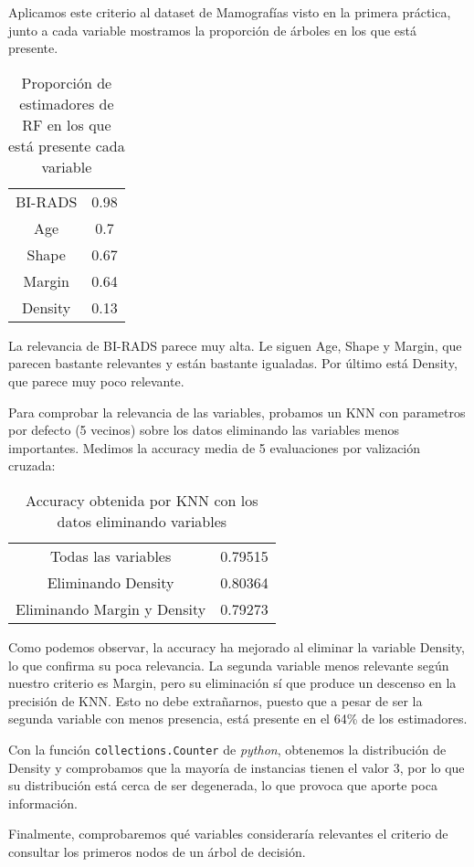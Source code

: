 \documentclass{article}
\begin{document}
  Aplicamos este criterio al dataset de Mamografías visto en la
  primera práctica, junto a cada variable mostramos la proporción de
  árboles en los que está presente.

  \begin{table}[H]
    \centering
    \begin{tabular}{c|c}
      BI-RADS     & 0.98 \\
      Age         & 0.7 \\
      Shape       & 0.67 \\
      Margin      & 0.64 \\
      Density     & 0.13
    \end{tabular}
    \caption{Proporción de estimadores de RF en los que está presente cada variable}
  \end{table}

  La relevancia de BI-RADS parece muy alta. Le siguen Age, Shape y
  Margin, que parecen bastante relevantes y están bastante
  igualadas. Por último está Density, que parece muy poco relevante.

  Para comprobar la relevancia de las variables, probamos un KNN con
  parametros por defecto (5 vecinos) sobre los datos eliminando las
  variables menos importantes. Medimos la accuracy media de 5
  evaluaciones por valización cruzada:

  \begin{table}[H]
    \centering
    \begin{tabular}{c|c}
      Todas las variables     & 0.79515 \\
      Eliminando Density         & 0.80364 \\
      Eliminando Margin y Density       & 0.79273
    \end{tabular}
    \caption{Accuracy obtenida por KNN con los datos eliminando
      variables}
  \end{table}

  Como podemos observar, la accuracy ha mejorado al eliminar la
  variable Density, lo que confirma su poca relevancia. La segunda
  variable menos relevante según nuestro criterio es Margin, pero su
  eliminación sí que produce un descenso en la precisión de KNN. Esto
  no debe extrañarnos, puesto que a pesar de ser la segunda variable
  con menos presencia, está presente en el 64\% de los estimadores.

  Con la función \texttt{collections.Counter} de \textit{python},
  obtenemos la distribución de Density y comprobamos que la mayoría de
  instancias tienen el valor 3, por lo que su distribución está cerca
  de ser degenerada, lo que provoca que aporte poca información.

  Finalmente, comprobaremos qué variables consideraría relevantes el
  criterio de consultar los primeros nodos de un árbol de decisión.
\end{document}
